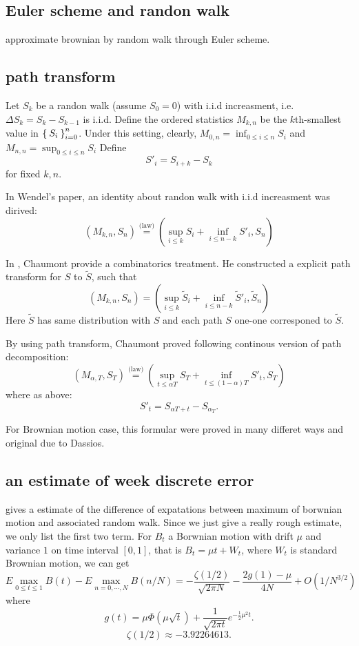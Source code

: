 \documentclass[11pt]{book}
\def\eqlaw{{\stackrel{\text{(law)}}{=}}}
\def\tS{{\widetilde{S}}}
\begin{document}
\subsection{Euler scheme and randon walk}
approximate brownian by random walk through Euler scheme.


\subsection{path transform}
Let $S_k$ be a randon walk (assume $S_0=0$)
with i.i.d increasment, i.e.
$\Delta S_k = S_k -  S_{k-1}$ is i.i.d.
Define the ordered statistics $M_{k,n}$ be the $k$th-smallest value in
$\Set{S_i}_{i=0}^n$.
Under this setting, clearly, $M_{0,n} = \inf_{0\leq i\leq n}S_i$
and $M_{n,n} = \sup_{0\leq i\leq n}S_i$
Define
\[S'_i = S_{i+k}-S_k\]
for fixed $k, n$.

In Wendel's paper\cite{Wendel1960}, an identity about randon walk with
i.i.d increasment was dirived:
\begin{equation}\label{eq:dpathdec}
(M_{k,n}, S_n) \eqlaw (\sup_{i\leq k} S_i +\inf_{i\leq n-k} S'_i, S_n)
\end{equation}

In
\cite{Chaumont1999}, Chaumont provide a combinatorics treatment.
He constructed a explicit path transform for $S$ to $\tS$, such that
\[
(M_{k,n}, S_n) = (\sup_{i\leq k} \tS_i+\inf_{i\leq n-k} \tS'_i, \tS_n)
\]
Here $\tS$ has same distribution with $S$ and each path $S$
 one-one corresponed to $\tS$.

By using path transform, Chaumont proved
following continous version of path decomposition:
\begin{equation}\label{eq:cpathdec}
(M_{\alpha,T}, S_T) \eqlaw (\sup_{t\leq \alpha{T}} S_T +\inf_{t \leq (1-\alpha)T} S'_t, S_T)
\end{equation}
where as above:
\[
S'_t = S_{\alpha T+t} - S_{\alpha_T}.
\]

For Brownian motion case, this formular were proved in many differet ways
and original due to Dassios\cite{Dassios1995}.

\subsection{an estimate of week discrete error}
\cite{Janssen2008} gives a estimate of the difference of  expatations
between maximum of borwnian motion and associated random walk.
Since we just give a really rough estimate, we only list the first two term.
For $B_t$ a Borwnian motion with drift $\mu$ and variance $1$ on time interval $[0,1]$, that is $B_t = \mu t + W_t$, where $W_t$ is standard Brownian motion, we can get
\begin{equation}\label{eq:est1}
E\max_{0\leq t \leq 1} B(t) - E\max_{n=0,\cdots, N}B(n/N)
= -\frac{\zeta(1/2)}{\sqrt{2\pi N}}-\frac{2g(1)-\mu}{4N} + O(1/N^{3/2})
\end{equation}
where
\[
g(t) = \mu \Phi(\mu \sqrt{t}) + \frac{1}{\sqrt{2\pi t}} e^{-\frac{1}{2}\mu^2 t}.
\]
\[
\zeta(1/2) \approx -3.92264613.
\]
\end{document}
